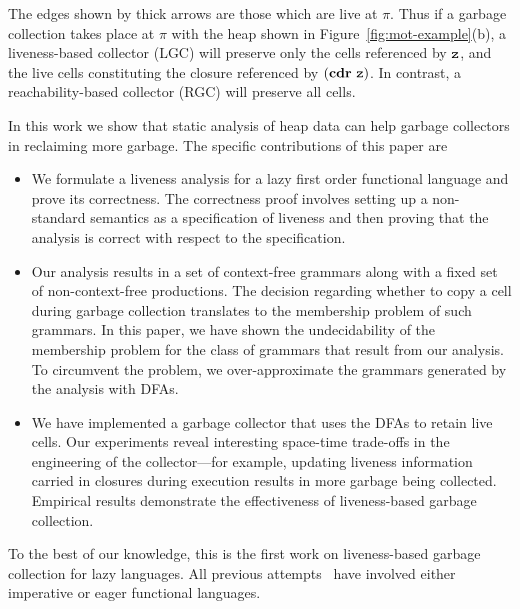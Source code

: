 \documentclass[preprint,9pt]{sigplanconf}
\begin{document}
The edges  shown by thick  arrows are those  which are live  at $\pi$.
Thus if a garbage collection  takes place at
$\pi$ with the heap shown in Figure~\ref{fig:mot-example}(b), a
liveness-based collector (LGC) will preserve only the cells referenced
by  $\mbox{\tt z}$,  and the live cells  constituting the  closure
referenced by $(\mbox{$\mathbf{cdr}$}~\mbox{\tt z})$.   In contrast, a reachability-based
collector (RGC) will preserve all cells.

In  this work  we show  that  static analysis  of heap  data can  help
garbage collectors in reclaiming more garbage.  The specific
contributions of this paper are
\begin{itemize}
\item  We  formulate  a  liveness  analysis for  a  lazy  first  order
  functional language and  prove its correctness. The correctness
  proof involves setting up a non-standard semantics as a
  specification of liveness and then proving that the analysis is
  correct with respect to the specification.   
\item Our  analysis results  in a set  of context-free  grammars along
  with  a fixed  set  of non-context-free  productions.  The  decision
  regarding  whether   to  copy  a  cell   during  garbage  collection
  translates  to the  membership problem  of such  grammars.  In  this
  paper, we  have shown the  undecidability of the  membership problem
  for  the  class  of  grammars  that result  from  our  analysis.  To
  circumvent the  problem, we  over-approximate the  grammars generated
  by the analysis with DFAs.
\item We  have implemented a garbage  collector that uses the  DFAs to
  retain live  cells.  Our  experiments reveal  interesting space-time
  trade-offs  in  the  engineering  of  the  collector---for  example,
  updating liveness  information carried in closures  during execution
  results  in   more  garbage  being  collected.    Empirical  results
  demonstrate the effectiveness of liveness-based garbage collection.
\end{itemize}
To the  best of our
  knowledge, this is the first work on liveness-based garbage
  collection      for      lazy     languages.       All      previous
  attempts~\cite{shaham01heap,   ran.shaham-sas03,   shaham02estimating,
    asati14lgc, karkare06effectiveness} have involved either
  imperative or  eager functional languages. 
\end{document}
